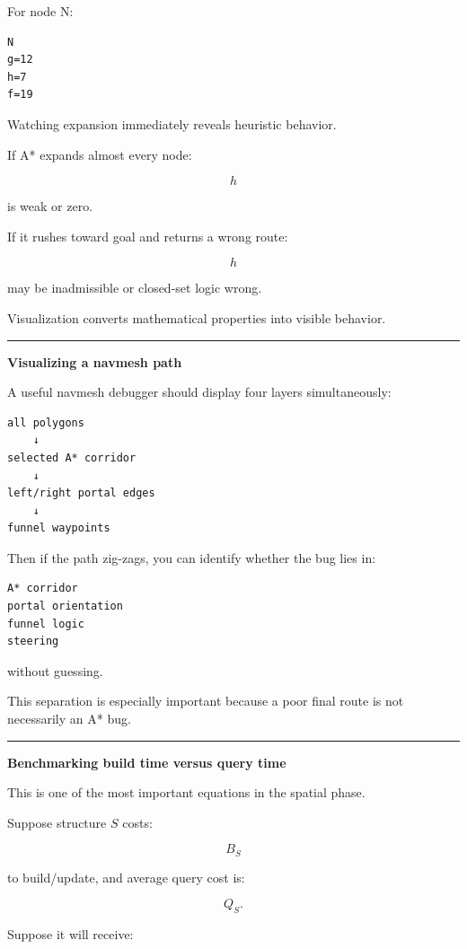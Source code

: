 For node N:

\begin{verbatim}
N
g=12
h=7
f=19
\end{verbatim}

Watching expansion immediately reveals heuristic behavior.

If A* expands almost every node:

\[
h
\]

is weak or zero.

If it rushes toward goal and returns a wrong route:

\[
h
\]

may be inadmissible or closed-set logic wrong.

Visualization converts mathematical properties into visible behavior.

\begin{center}\rule{0.5\linewidth}{0.5pt}\end{center}

\textbf{Visualizing a navmesh path}

A useful navmesh debugger should display four layers simultaneously:

\begin{verbatim}
all polygons
    ↓
selected A* corridor
    ↓
left/right portal edges
    ↓
funnel waypoints
\end{verbatim}

Then if the path zig-zags, you can identify whether the bug lies in:

\begin{verbatim}
A* corridor
portal orientation
funnel logic
steering
\end{verbatim}

without guessing.

This separation is especially important because a poor final route is not necessarily an A* bug.

\begin{center}\rule{0.5\linewidth}{0.5pt}\end{center}

\textbf{Benchmarking build time versus query time}

This is one of the most important equations in the spatial phase.

Suppose structure \(S\) costs:

\[
B_S
\]

to build/update, and average query cost is:

\[
Q_S.
\]

Suppose it will receive:

